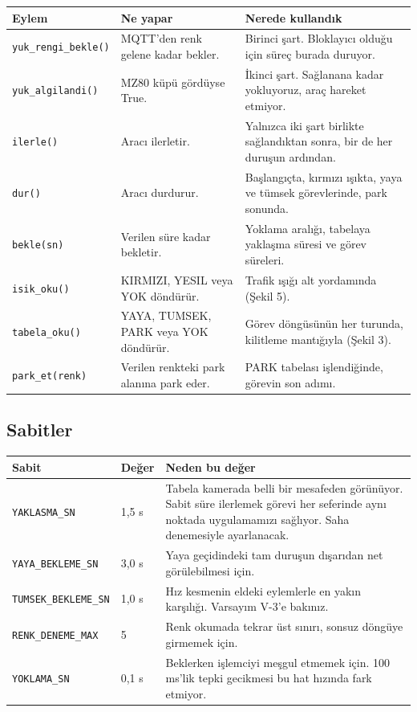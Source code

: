 \documentclass[11pt,a4paper]{article}
\newcommand{\ey}[1]{\texttt{#1}}
\begin{document}
\begin{longtable}{@{}p{3.4cm}p{4.1cm}p{7.2cm}@{}}
\toprule
\textbf{Eylem} & \textbf{Ne yapar} & \textbf{Nerede kullandık} \\
\midrule
\endhead
\ey{yuk\_rengi\_bekle()} & MQTT'den renk gelene kadar bekler. &
Birinci şart. Bloklayıcı olduğu için süreç burada duruyor. \\
\addlinespace
\ey{yuk\_algilandi()} & MZ80 küpü gördüyse True. &
İkinci şart. Sağlanana kadar yokluyoruz, araç hareket etmiyor. \\
\addlinespace
\ey{ilerle()} & Aracı ilerletir. &
Yalnızca iki şart birlikte sağlandıktan sonra, bir de her duruşun ardından. \\
\addlinespace
\ey{dur()} & Aracı durdurur. &
Başlangıçta, kırmızı ışıkta, yaya ve tümsek görevlerinde, park sonunda. \\
\addlinespace
\ey{bekle(sn)} & Verilen süre kadar bekletir. &
Yoklama aralığı, tabelaya yaklaşma süresi ve görev süreleri. \\
\addlinespace
\ey{isik\_oku()} & KIRMIZI, YESIL veya YOK döndürür. &
Trafik ışığı alt yordamında (Şekil 5). \\
\addlinespace
\ey{tabela\_oku()} & YAYA, TUMSEK, PARK veya YOK döndürür. &
Görev döngüsünün her turunda, kilitleme mantığıyla (Şekil 3). \\
\addlinespace
\ey{park\_et(renk)} & Verilen renkteki park alanına park eder. &
PARK tabelası işlendiğinde, görevin son adımı. \\
\bottomrule
\end{longtable}

\subsection*{Sabitler}

\begin{longtable}{@{}p{4.2cm}p{1.5cm}p{9cm}@{}}
\toprule
\textbf{Sabit} & \textbf{Değer} & \textbf{Neden bu değer} \\
\midrule
\endhead
\ey{YAKLASMA\_SN} & 1,5 s &
Tabela kamerada belli bir mesafeden görünüyor. Sabit süre ilerlemek görevi her
seferinde aynı noktada uygulamamızı sağlıyor. Saha denemesiyle ayarlanacak. \\
\addlinespace
\ey{YAYA\_BEKLEME\_SN} & 3,0 s &
Yaya geçidindeki tam duruşun dışarıdan net görülebilmesi için. \\
\addlinespace
\ey{TUMSEK\_BEKLEME\_SN} & 1,0 s &
Hız kesmenin eldeki eylemlerle en yakın karşılığı. Varsayım V-3'e bakınız. \\
\addlinespace
\ey{RENK\_DENEME\_MAX} & 5 &
Renk okumada tekrar üst sınırı, sonsuz döngüye girmemek için. \\
\addlinespace
\ey{YOKLAMA\_SN} & 0,1 s &
Beklerken işlemciyi meşgul etmemek için. 100 ms'lik tepki gecikmesi bu hat
hızında fark etmiyor. \\
\bottomrule
\end{longtable}
\end{document}
